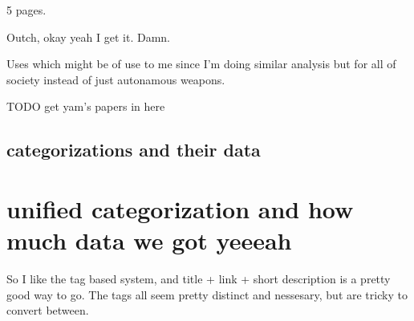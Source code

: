 \documentclass[11pt]{article}
\begin{document}
\cite{cook1998complex}

5 pages. 

Outch, okay yeah I get it. Damn.

\cite{carvin2017normal}

Uses  which might be of use to me since I'm doing
similar analysis but for all of society instead of just autonamous weapons.

\cite{maas2018regulating}
\cite{humbatova2019taxonomy}

TODO get yam's papers in here

\subsection{categorizations and their data}

\section{unified categorization and how much data we got yeeeah}

So I like the tag based system, and title + link + short description is a pretty good way to go. The
tags all seem pretty distinct and nessesary, but are tricky to convert between.

{}

\end{document}
